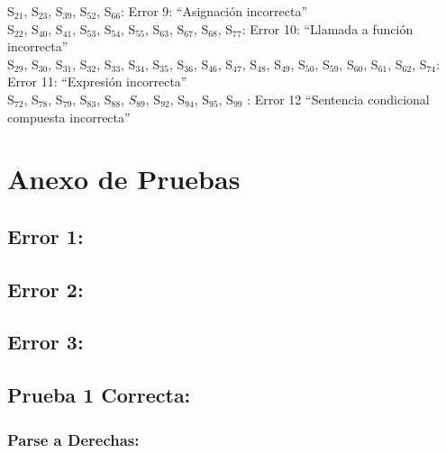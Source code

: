 \documentclass[a4paper, 12pt]{article}
\begin{document}
S$_{21}$, S$_{23}$, S$_{39}$, S$_{52}$, S$_{66}$: Error 9: “Asignación incorrecta” \\

S$_{22}$, S$_{40}$, S$_{41}$, S$_{53}$, S$_{54}$, S$_{55}$, S$_{63}$, S$_{67}$, S$_{68}$, S$_{77}$: Error 10: “Llamada a función incorrecta”\\

S$_{29}$, S$_{30}$, S$_{31}$, S$_{32}$, S$_{33}$, S$_{34}$, S$_{35}$, S$_{36}$, S$_{46}$, S$_{47}$, S$_{48}$, S$_{49}$, S$_{50}$, S$_{59}$, S$_{60}$, S$_{61}$, S$_{62}$, S$_{74}$:\\
\indent Error 11: “Expresión incorrecta”\\

S$_{72}$, S$_{78}$, S$_{79}$, S$_{83}$, S$_{88}$, $S_{89}$, S$_{92}$, S$_{94}$, S$_{95}$, S$_{99}$ : Error 12 “Sentencia condicional compuesta incorrecta” \\


\section{Anexo de Pruebas}
\subsection*{Error 1:}



\subsection*{Error 2:}



\subsection*{Error 3:}



\subsection*{Prueba 1 Correcta:}

\subsubsection*{Parse a Derechas:}



\end{document}
